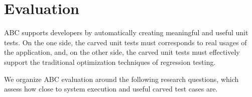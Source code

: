 \documentclass[10pt,conference]{IEEEtran}
\newcommand{\abc}{\textsf{ABC}\xspace}
\begin{document}




\section{Evaluation}
\abc supports developers by automatically creating meaningful and useful unit tests.
On the one side, the carved unit tests must corresponds to real usages of the application, and,
on the other side, the carved unit tests must effectively support the traditional
optimization techniques of regression testing.

We organize \abc evaluation around the following research questions, which assess how close
to system execution and useful carved test cases are.

\newenvironment{RQ}[1][]{\refstepcounter{RQ}\par\noindent
   \textbf{RQ\theRQ. #1} \rmfamily}{}
\end{document}
